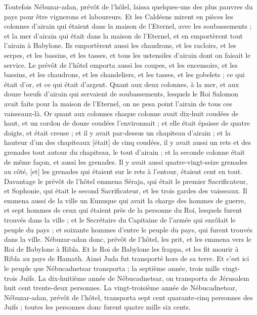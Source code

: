 \begin{multicols}{2}
Toutefois Nébuzar-adan, prévôt de l'hôlel, laissa quelques-uns des plus pauvres du pays pour être vignerons et laboureurs.
Et les Caldéens mirent en pièces les colonnes d'airain qui étaient dans la maison de l'Eternel, avec les soubassements ; et la mer d'airain qui était dans la maison de l'Eternel, et en emportèrent tout l'airain à Babylone.
Ils emportèrent aussi les chaudrons, et les racloirs, et les serpes, et les bassins, et les tasses, et tous les ustensiles d'airain dont on faisait le service.
Le prévôt de l'hôtel emporta aussi les coupes, et les encensoirs, et les bassins, et les chaudrons, et les chandeliers, et les tasses, et les gobelets ; ce qui était d'or, et ce qui était d'argent.
Quant aux deux colonnes, à la mer, et aux douze bœufs d'airain qui servaient de soubassements, lesquels le Roi Salomon avait faits pour la maison de l'Eternel, on ne pesa point l'airain de tous ces vaisseaux-là.
Or quant aux colonnes chaque colonne avait dix-huit coudées de haut, et un cordon de douze coudées l'environnait ; et elle était épaisse de quatre doigts, et était creuse ;
et il y avait par-dessus un chapiteau d'airain ; et la hauteur d'un des chapiteaux [était] de cinq coudées, il y avait aussi un rets et des grenades tout autour du chapiteau, le tout d'airain ; et la seconde colonne était de même façon, et aussi les grenades.
Il y avait aussi quatre-vingt-seize grenades au côté, [et] les grenades qui étaient sur le rets à l'entour, étaient cent en tout.
Davantage le prévôt de l'hôtel emmena Séraja, qui était le premier Sacrificateur, et Sophonie, qui était le second Sacrificateur, et les trois gardes des vaisseaux.
Il emmena aussi de la ville un Eunuque qui avait la charge des hommes de guerre, et sept hommes de ceux qui étaient près de la personne du Roi, lesquels furent trouvés dans la ville ; et le Secrétaire du Capitaine de l'armée qui enrôlait le peuple du pays ; et soixante hommes d'entre le peuple du pays, qui furent trouvés dans la ville.
Nébuzar-adan donc, prévôt de l'hôtel, les prit, et les emmena vers le Roi de Babylone à Ribla.
Et le Roi de Babylone les frappa, et les fit mourir à Ribla au pays de Hamath. Ainsi Juda fut transporté hors de sa terre.
Et c'est ici le peuple que Nébucadnetsar transporta ; la septième année, trois mille vingt-trois Juifs.
La dix-huitième année de Nébucadnetsar, on transporta de Jérusalem huit cent trente-deux personnes.
La vingt-troisième année de Nébucadnetsar, Nébuzar-adan, prévôt de l'hôtel, transporta sept cent quarante-cinq personnes des Juifs ; toutes les personnes donc furent quatre mille six cents.

\end{multicols}
